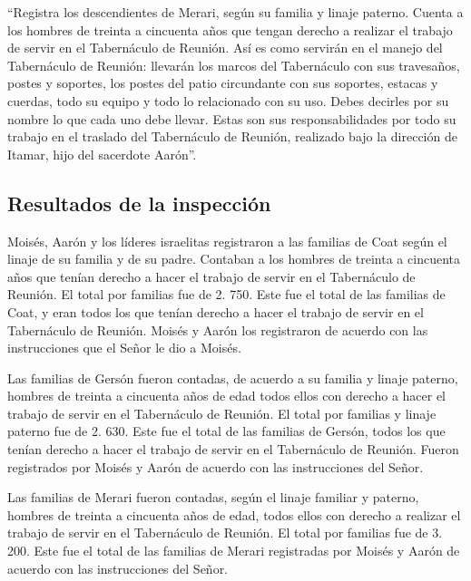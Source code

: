  ``Registra los descendientes de Merari, según su familia
y linaje paterno.  Cuenta a los hombres de treinta a
cincuenta años que tengan derecho a realizar el trabajo de servir en el
Tabernáculo de Reunión.  Así es como servirán en el
manejo del Tabernáculo de Reunión: llevarán los marcos del Tabernáculo
con sus travesaños, postes y soportes,  los postes del
patio circundante con sus soportes, estacas y cuerdas, todo su equipo y
todo lo relacionado con su uso. Debes decirles por su nombre lo que cada
uno debe llevar.  Estas son sus responsabilidades por
todo su trabajo en el traslado del Tabernáculo de Reunión, realizado
bajo la dirección de Itamar, hijo del sacerdote Aarón''.

\hypertarget{resultados-de-la-inspecciuxf3n}{%
\subsection{Resultados de la
inspección}\label{resultados-de-la-inspecciuxf3n}}

 Moisés, Aarón y los líderes israelitas registraron a las
familias de Coat según el linaje de su familia y de su padre.
 Contaban a los hombres de treinta a cincuenta años que
tenían derecho a hacer el trabajo de servir en el Tabernáculo de
Reunión.  El total por familias fue de 2. 750.
 Este fue el total de las familias de Coat, y eran todos
los que tenían derecho a hacer el trabajo de servir en el Tabernáculo de
Reunión. Moisés y Aarón los registraron de acuerdo con las instrucciones
que el Señor le dio a Moisés.

 Las familias de Gersón fueron contadas, de acuerdo a su
familia y linaje paterno,  hombres de treinta a cincuenta
años de edad todos ellos con derecho a hacer el trabajo de servir en el
Tabernáculo de Reunión.  El total por familias y linaje
paterno fue de 2. 630.  Este fue el total de las familias
de Gersón, todos los que tenían derecho a hacer el trabajo de servir en
el Tabernáculo de Reunión. Fueron registrados por Moisés y Aarón de
acuerdo con las instrucciones del Señor.

 Las familias de Merari fueron contadas, según el linaje
familiar y paterno,  hombres de treinta a cincuenta años
de edad, todos ellos con derecho a realizar el trabajo de servir en el
Tabernáculo de Reunión.  El total por familias fue de 3.
200.  Este fue el total de las familias de Merari
registradas por Moisés y Aarón de acuerdo con las instrucciones del
Señor.

